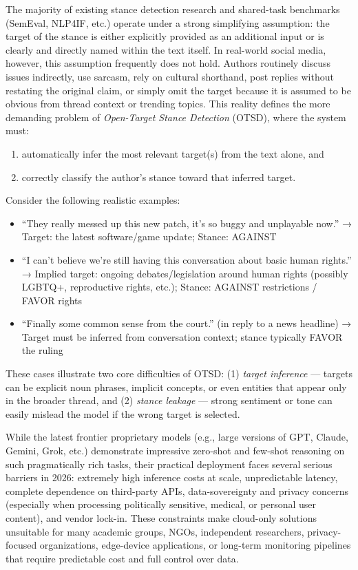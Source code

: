 \documentclass[conference]{IEEEtran}
\begin{document}
The majority of existing stance detection research and shared-task benchmarks (SemEval, NLP4IF, etc.) operate under a strong simplifying assumption: the target of the stance is either explicitly provided as an additional input or is clearly and directly named within the text itself. In real-world social media, however, this assumption frequently does not hold. Authors routinely discuss issues indirectly, use sarcasm, rely on cultural shorthand, post replies without restating the original claim, or simply omit the target because it is assumed to be obvious from thread context or trending topics. This reality defines the more demanding problem of \emph{Open-Target Stance Detection} (OTSD), where the system must:

\begin{enumerate}
    \item automatically infer the most relevant target(s) from the text alone, and
    \item correctly classify the author’s stance toward that inferred target.
\end{enumerate}

Consider the following realistic examples:
\begin{itemize}
    \item ``They really messed up this new patch, it's so buggy and unplayable now.''  
      → Target: the latest software/game update; Stance: AGAINST
    \item ``I can't believe we're still having this conversation about basic human rights.''  
      → Implied target: ongoing debates/legislation around human rights (possibly LGBTQ+, reproductive rights, etc.); Stance: AGAINST restrictions / FAVOR rights
    \item ``Finally some common sense from the court.'' (in reply to a news headline)  
      → Target must be inferred from conversation context; stance typically FAVOR the ruling
\end{itemize}

These cases illustrate two core difficulties of OTSD: (1) \emph{target inference} — targets can be explicit noun phrases, implicit concepts, or even entities that appear only in the broader thread, and (2) \emph{stance leakage} — strong sentiment or tone can easily mislead the model if the wrong target is selected.

While the latest frontier proprietary models (e.g., large versions of GPT, Claude, Gemini, Grok, etc.) demonstrate impressive zero-shot and few-shot reasoning on such pragmatically rich tasks, their practical deployment faces several serious barriers in 2026: extremely high inference costs at scale, unpredictable latency, complete dependence on third-party APIs, data-sovereignty and privacy concerns (especially when processing politically sensitive, medical, or personal user content), and vendor lock-in. These constraints make cloud-only solutions unsuitable for many academic groups, NGOs, independent researchers, privacy-focused organizations, edge-device applications, or long-term monitoring pipelines that require predictable cost and full control over data.
\end{document}
